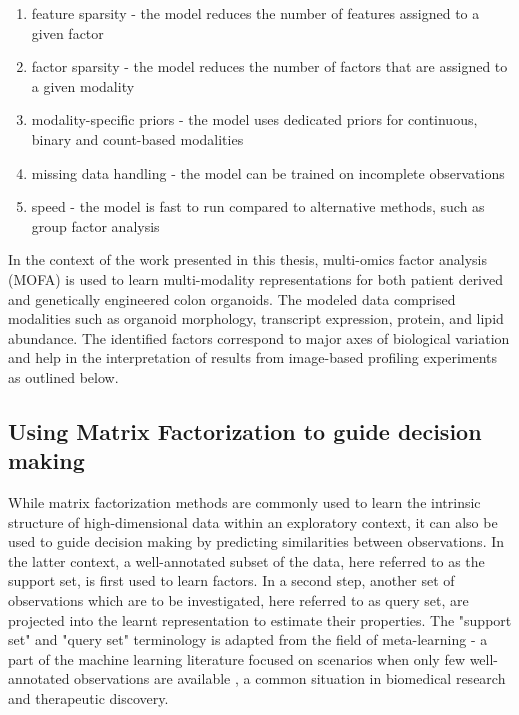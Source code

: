 \begin{flushleft}
\begin{enumerate}
    \item feature sparsity - the model reduces the number of features assigned to a given factor
    \item factor sparsity - the model reduces the number of factors that are assigned to a given modality
    \item modality-specific priors - the model uses dedicated priors for continuous, binary and count-based modalities 
    \item missing data handling - the model can be trained on incomplete observations
    \item speed - the model is fast to run compared to alternative methods, such as group factor analysis
\end{enumerate}
 
\bigbreak
In the context of the work presented in this thesis, multi-omics factor analysis (MOFA) is used to learn multi-modality representations for both patient derived and genetically engineered colon organoids. The modeled data comprised modalities such as organoid morphology, transcript expression, protein, and lipid abundance. The identified factors correspond to major axes of biological variation and help in the interpretation of results from image-based profiling experiments as outlined below. 

\subsection{Using Matrix Factorization to guide decision making}

While matrix factorization methods are commonly used to learn the intrinsic structure of high-dimensional data within an exploratory context, it can also be used to guide decision making by predicting similarities between observations. In the latter context, a well-annotated subset of the data, here referred to as the support set, is first used to learn factors. In a second step, another set of observations which are to be investigated, here referred to as query set, are projected into the learnt representation to estimate their properties. The "support set" and "query set" terminology is adapted from the field of meta-learning - a part of the machine learning literature focused on scenarios when only few well-annotated observations are available \citep{hospedalesMetaLearningNeuralNetworks2020}, a common situation in biomedical research and therapeutic discovery. 
\par


\end{flushleft}

